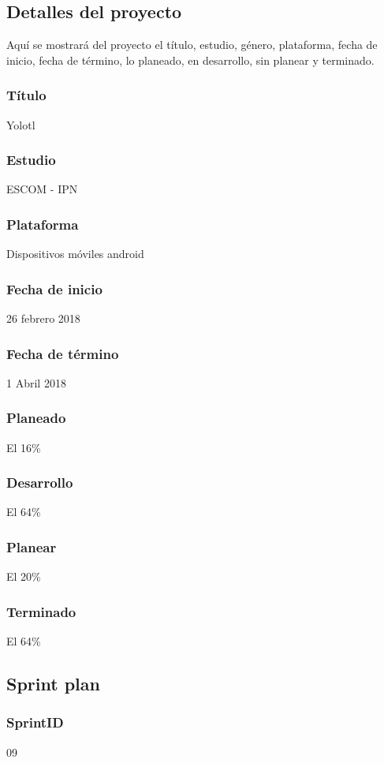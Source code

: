 \subsection{Detalles del proyecto}
Aquí se mostrará del proyecto el título, estudio, género, plataforma, fecha de inicio, fecha de término, lo planeado, en desarrollo, sin planear y terminado.
\\
\subsubsection{Título}
Yolotl

\subsubsection{Estudio}
ESCOM - IPN

\subsubsection{Plataforma}
Dispositivos móviles android

\subsubsection{Fecha de inicio}
26 febrero 2018
\subsubsection{Fecha de término}
1 Abril 2018
\subsubsection{Planeado}
El 16\%
\subsubsection{Desarrollo}
El 64\%
\subsubsection{Planear}
El 20\%
\subsubsection{Terminado}
El 64\%



\subsection{Sprint plan}
\subsubsection{SprintID}
09
